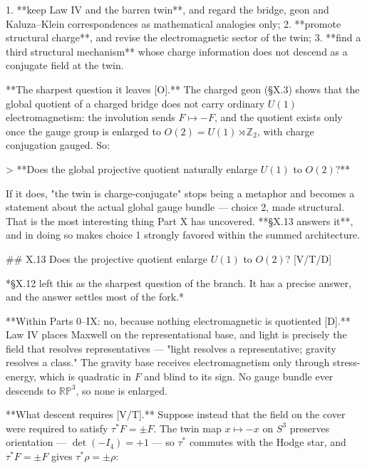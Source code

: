 1. **keep Law IV and the barren twin**, and regard the bridge, geon and Kaluza–Klein correspondences as mathematical analogies only;
2. **promote structural charge**, and revise the electromagnetic sector of the twin;
3. **find a third structural mechanism** whose charge information does not descend as a conjugate field at the twin.

**The sharpest question it leaves [O].** The charged geon (§X.3) shows that the global quotient of a charged bridge does not carry ordinary $U(1)$ electromagnetism: the involution sends $F\mapsto-F$, and the quotient exists only once the gauge group is enlarged to $O(2) = U(1)\rtimes\mathbb{Z}_2$, with charge conjugation gauged. So:

> **Does the global projective quotient naturally enlarge $U(1)$ to $O(2)$?**

If it does, "the twin is charge-conjugate" stops being a metaphor and becomes a statement about the actual global gauge bundle — choice 2, made structural. That is the most interesting thing Part X has uncovered. **§X.13 answers it**, and in doing so makes choice 1 strongly favored within the summed architecture.

## X.13 Does the projective quotient enlarge $U(1)$ to $O(2)$? [V/T/D]

*§X.12 left this as the sharpest question of the branch. It has a precise answer, and the answer settles most of the fork.*

**Within Parts 0–IX: no, because nothing electromagnetic is quotiented [D].** Law IV places Maxwell on the representational base, and light is precisely the field that resolves representatives — "light resolves a representative; gravity resolves a class." The gravity base receives electromagnetism only through stress-energy, which is quadratic in $F$ and blind to its sign. No gauge bundle ever descends to $\mathbb{RP}^3$, so none is enlarged.

**What descent requires [V/T].** Suppose instead that the field on the cover were required to satisfy $\tau^*F = \pm F$. The twin map $x\mapsto-x$ on $S^3$ preserves orientation — $\det(-I_4) = +1$ — so $\tau^*$ commutes with the Hodge star, and $\tau^*F = \pm F$ gives $\tau^*\rho = \pm\rho$:

